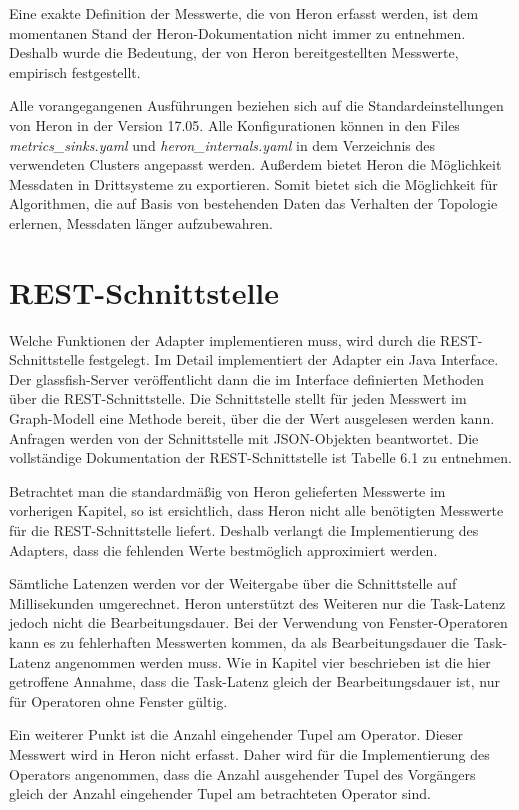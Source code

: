 Eine exakte Definition der Messwerte, die von Heron erfasst werden, ist dem momentanen Stand der Heron-Dokumentation nicht immer zu entnehmen. 
Deshalb wurde die Bedeutung, der von Heron bereitgestellten Messwerte, empirisch festgestellt.

Alle vorangegangenen Ausführungen beziehen sich auf die Standardeinstellungen von Heron in der Version 17.05.
Alle Konfigurationen können in den Files \textit{metrics\_sinks.yaml} und \textit{heron\_internals.yaml} in dem Verzeichnis des verwendeten Clusters angepasst werden. 
Außerdem bietet Heron die Möglichkeit Messdaten in Drittsysteme zu exportieren.
Somit bietet sich die Möglichkeit für Algorithmen, die auf Basis von bestehenden Daten das Verhalten der Topologie erlernen, Messdaten länger aufzubewahren.

\section{REST-Schnittstelle}

Welche Funktionen der Adapter implementieren muss, wird durch die REST-Schnittstelle festgelegt.
Im Detail implementiert der Adapter ein Java Interface.
Der glassfish-Server veröffentlicht dann die im Interface definierten Methoden über die REST-Schnittstelle.
Die Schnittstelle stellt für jeden Messwert im Graph-Modell eine Methode bereit, über die der Wert ausgelesen werden kann.
Anfragen werden von der Schnittstelle mit JSON-Objekten beantwortet.
Die vollständige Dokumentation der REST-Schnittstelle ist Tabelle 6.1 zu entnehmen.


Betrachtet man die standardmäßig von Heron gelieferten Messwerte im vorherigen Kapitel, so ist ersichtlich, dass Heron nicht alle benötigten Messwerte für die REST-Schnittstelle liefert.
Deshalb verlangt die Implementierung des Adapters, dass die fehlenden Werte bestmöglich approximiert werden.

Sämtliche Latenzen werden vor der Weitergabe über die Schnittstelle auf Millisekunden umgerechnet.
Heron unterstützt des Weiteren nur die Task-Latenz jedoch nicht die Bearbeitungsdauer.
Bei der Verwendung von Fenster-Operatoren kann es zu fehlerhaften Messwerten kommen, da als Bearbeitungsdauer die Task-Latenz angenommen werden muss.
Wie in Kapitel vier beschrieben ist die hier getroffene Annahme, dass die Task-Latenz gleich der Bearbeitungsdauer ist, nur für Operatoren ohne Fenster gültig.

Ein weiterer Punkt ist die Anzahl eingehender Tupel am Operator.
Dieser Messwert wird in Heron nicht erfasst.
Daher wird für die Implementierung des Operators angenommen, dass die Anzahl ausgehender Tupel des Vorgängers gleich der Anzahl eingehender Tupel am betrachteten Operator sind.

